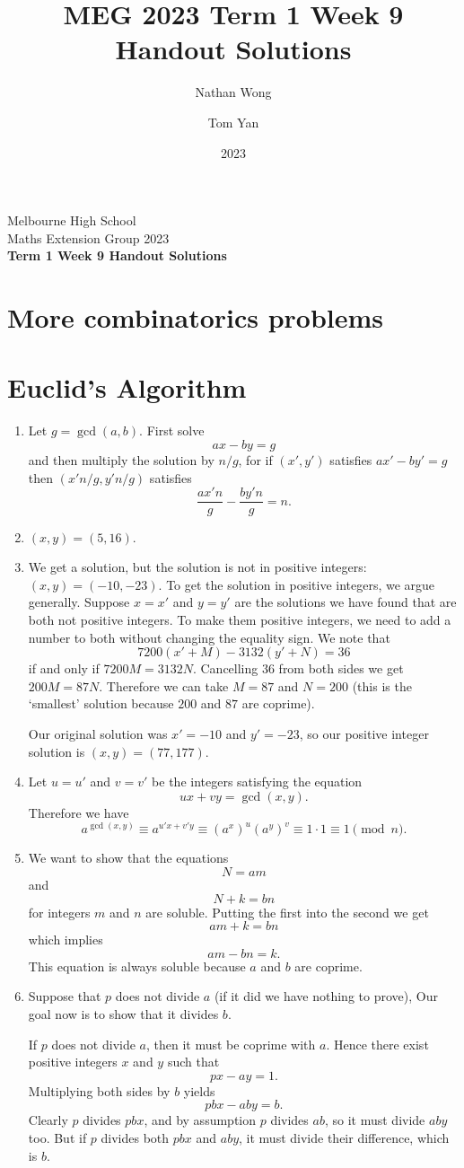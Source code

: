 \documentclass[a4paper,10pt]{article}
\title{MEG 2023 Term 1 Week 9 Handout Solutions}
\author{Nathan Wong\and Tom Yan}
\date{2023}
\newcommand{\thetitle}{Term 1 Week 9 Handout Solutions}
\begin{document}
\noindent Melbourne High School\\
Maths Extension Group 2023\\
\textbf{\thetitle}\\
\section{More combinatorics problems}
\section{Euclid's Algorithm}
\begin{enumerate}
\item Let \(g=\gcd(a,b).\) First solve \[ax-by=g\] and then multiply the solution
  by \(n/g\), for if \((x',y')\) satisfies
  \(ax'-by'=g\) then \((x'n/g,y'n/g)\) satisfies
  \[\frac{ax'n}{g}-\frac{by'n}{g}=n.\]
\item \((x,y)=(5,16).\)
\item We get a solution, but the solution is not in positive
  integers: \((x,y)=(-10,-23).\) To get the solution in positive
  integers, we argue generally. Suppose \(x=x'\) and \(y=y'\) are
  the solutions we have found that are both not positive integers.
  To make them positive integers, we need to add a number to
  both without changing the equality sign. We note that
  \[7200(x'+M)-3132(y'+N)=36\] if and only if
  \(7200M=3132N\). Cancelling \(36\) from both sides
  we get \(200M=87N\). Therefore we can take \(M=87\)
  and \(N=200\) (this is the `smallest' solution because
  \(200\) and \(87\) are coprime).

  Our original solution was \(x'=-10\) and \(y'=-23\), so
  our positive integer solution is \((x,y)=(77, 177)\).
\item Let \(u=u'\) and \(v=v'\) be the integers satisfying
  the equation \[ux+vy=\gcd(x,y).\] Therefore we have
  \[a^{\gcd(x,y)}\equiv a^{u'x+v'y}\equiv(a^x)^u(a^y)^v\equiv1\cdot1\equiv1\pmod{n}.\]
\item We want to show that the equations \[N=am\] and \[N+k=bn\]
  for integers \(m\) and \(n\) are soluble. Putting the first
  into the second we get \[am+k=bn\] which implies \[am-bn=k.\]
  This equation is always soluble because \(a\) and \(b\)
  are coprime.
\item Suppose that \(p\) does not divide \(a\) (if it did we
  have nothing to prove), Our goal now is to show that it
  divides \(b\).

  If \(p\) does not divide \(a\), then it must be coprime with
  \(a\). Hence there exist positive integers \(x\) and \(y\) such that
  \[ px-ay=1.\]
  Multiplying both sides by \(b\) yields
  \[ pbx-aby=b.\]
  Clearly \(p\) divides \(pbx\), and by assumption \(p\) divides
  \(ab\), so it must divide \(aby\) too. But if \(p\) divides
  both \(pbx\) and \(aby\), it must divide their difference,
  which is \(b\).

\end{enumerate}
\end{document}
